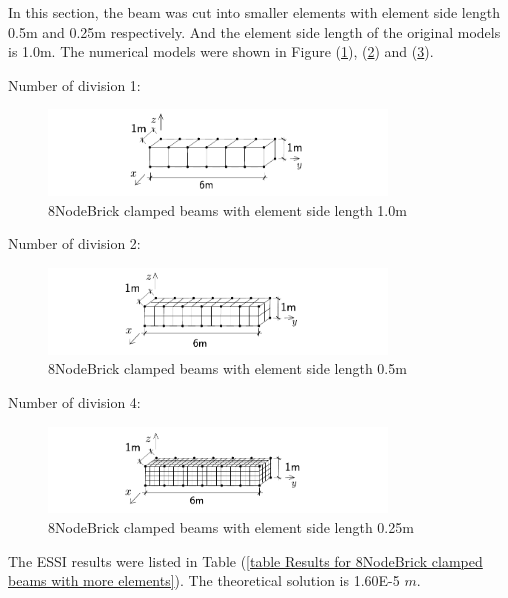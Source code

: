\documentclass[fleqn,11pt]{article}
\begin{document}
\newpage
In this section, the beam was cut into smaller elements with element side length 0.5m and 0.25m respectively. And the element side length of the original models is 1.0m. The numerical models were shown in Figure (\ref{fig 8NodeBrick clamped beams with element side length 1.0m}), (\ref{fig 8NodeBrick clamped beams with element side length 0.5m}) and (\ref{fig 8NodeBrick clamped beams with element side length 0.25m}). 

Number of division 1:

\begin{figure}[H]
  \centering
  \includegraphics[width=9cm]{../Figure-files/beam_8brick.pdf}
  \caption{8NodeBrick clamped beams with element side length 1.0m}
  \label{fig 8NodeBrick clamped beams with element side length 1.0m}
\end{figure}

Number of division 2:

\begin{figure}[H]
  \centering
  \includegraphics[width=9cm]{../Figure-files/beam_8brick_more_2.pdf}
  \caption{8NodeBrick clamped beams with element side length 0.5m}
  \label{fig 8NodeBrick clamped beams with element side length 0.5m}
\end{figure}

Number of division 4:

\begin{figure}[H]
  \centering
  \includegraphics[width=9cm]{../Figure-files/beam_8brick_more.pdf}
  \caption{8NodeBrick clamped beams with element side length 0.25m}
  \label{fig 8NodeBrick clamped beams with element side length 0.25m}
\end{figure}


The ESSI results were listed in Table (\ref{table Results for 8NodeBrick clamped beams with more elements}). 
The theoretical solution is 1.60E-5 $m$. 
\end{document}
